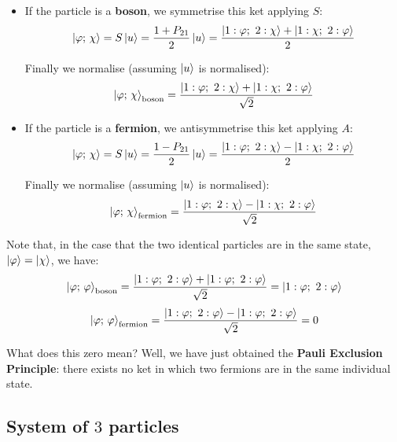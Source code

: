 \begin{itemize}
    \item If the particle is a \textbf{boson}, we symmetrise this ket applying $S$:
    \begin{equation}
        \ket{\varphi;\, \chi} = S\ket{u} = \frac{1 + P_{21}}{2}\ket{u} = \frac{\ket{1:\varphi;\ 2:\chi} + \ket{1:\chi;\ 2:\varphi}}{2}
    \end{equation}

    Finally we normalise (assuming $\ket{u}$ is normalised):
    \begin{equation}
        \ket{\varphi;\, \chi}_\text{boson} = \frac{\ket{1:\varphi;\ 2:\chi} + \ket{1:\chi;\ 2:\varphi}}{\sqrt{2}}
    \end{equation}
    \item If the particle is a \textbf{fermion}, we antisymmetrise this ket applying $A$:
    \begin{equation}
        \ket{\varphi;\, \chi} = S\ket{u} = \frac{1 - P_{21}}{2}\ket{u} = \frac{\ket{1:\varphi;\ 2:\chi} - \ket{1:\chi;\ 2:\varphi}}{2}
    \end{equation}

    Finally we normalise (assuming $\ket{u}$ is normalised):
    \begin{equation}
        \ket{\varphi;\, \chi}_\text{fermion} = \frac{\ket{1:\varphi;\ 2:\chi} - \ket{1:\chi;\ 2:\varphi}}{\sqrt{2}}
    \end{equation}
\end{itemize}

Note that, in the case that the two identical particles are in the same state, $\ket{\varphi} = \ket{\chi}$, we have:
\begin{equation}
    \ket{\varphi;\, \varphi}_\text{boson} = \frac{\ket{1:\varphi;\ 2:\varphi} + \ket{1:\varphi;\ 2:\varphi}}{\sqrt{2}} = \ket{1:\varphi;\ 2:\varphi}
\end{equation}
\begin{equation}
    \ket{\varphi;\, \varphi}_\text{fermion} = \frac{\ket{1:\varphi;\ 2:\varphi} - \ket{1:\varphi;\ 2:\varphi}}{\sqrt{2}} = 0
\end{equation}

What does this zero mean? Well, we have just obtained the \textbf{Pauli Exclusion Principle}: there exists no ket in which two fermions are in the same individual state. 

\subsection{System of $3$ particles}

